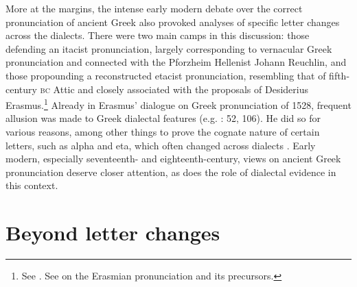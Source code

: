 More at the margins, the intense early modern debate over the correct pronunciation of ancient Greek also provoked analyses of specific letter changes across the dialects. There were two main camps in this discussion: those defending an itacist pronunciation, largely corresponding to vernacular Greek pronunciation and connected with the Pforzheim Hellenist Johann Reuchlin, and those propounding a reconstructed etacist pronunciation, resembling that of fifth-century \textsc{bc} Attic and closely associated with the proposals of Desiderius Erasmus.\footnote{See \citet[\textsc{ii.}130]{Sandys1908}. See \citet{Bywater1908} on the Erasmian pronunciation and its precursors.} Already in Erasmus’ dialogue on Greek pronunciation of 1528, frequent allusion was made to Greek dialectal features (e.g. \citealt{Erasmus1528}: 52, 106). He did so for various reasons, among other things to prove the cognate nature of certain letters, such as alpha and eta, which often changed across dialects \citep[62]{Erasmus1528}. Early modern, especially seventeenth- and eighteenth-century, views on ancient Greek pronunciation deserve closer attention, as does the role of dialectal evidence in this context.

\section{Beyond letter changes}\label{sec:6.3}

